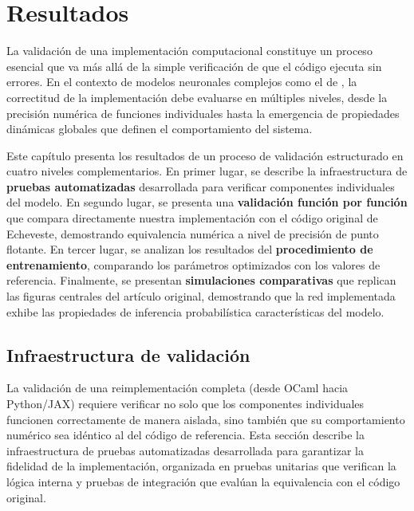 \chapter{Resultados}
\label{chapter:resultados}

La validación de una implementación computacional constituye un proceso esencial que va más allá de la simple verificación de que el código ejecuta sin errores. En el contexto de modelos neuronales complejos como el de \citet{echeveste2020cortical}, la correctitud de la implementación debe evaluarse en múltiples niveles, desde la precisión numérica de funciones individuales hasta la emergencia de propiedades dinámicas globales que definen el comportamiento del sistema.

Este capítulo presenta los resultados de un proceso de validación estructurado en cuatro niveles complementarios. En primer lugar, se describe la infraestructura de \textbf{pruebas automatizadas} desarrollada para verificar componentes individuales del modelo. En segundo lugar, se presenta una \textbf{validación función por función} que compara directamente nuestra implementación con el código original de Echeveste, demostrando equivalencia numérica a nivel de precisión de punto flotante. En tercer lugar, se analizan los resultados del \textbf{procedimiento de entrenamiento}, comparando los parámetros optimizados con los valores de referencia. Finalmente, se presentan \textbf{simulaciones comparativas} que replican las figuras centrales del artículo original, demostrando que la red implementada exhibe las propiedades de inferencia probabilística características del modelo.


\section{Infraestructura de validación}
\label{sec:res_tests}

La validación de una reimplementación completa (desde OCaml hacia Python/JAX) requiere verificar no solo que los componentes individuales funcionen correctamente de manera aislada, sino también que su comportamiento numérico sea idéntico al del código de referencia. Esta sección describe la infraestructura de pruebas automatizadas desarrollada para garantizar la fidelidad de la implementación, organizada en pruebas unitarias que verifican la lógica interna y pruebas de integración que evalúan la equivalencia con el código original.

